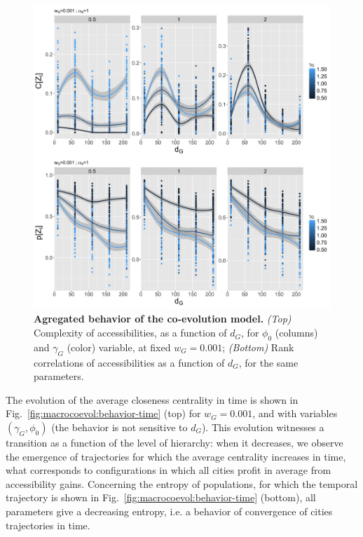 \begin{figure}
\includegraphics[width=\linewidth]{figures/6-2-2-fig-macrocoevol-behavior-aggreg.jpg}
\caption{\textbf{Agregated behavior of the co-evolution model.} \textit{(Top)} Complexity of accessibilities, as a function of $d_G$, for $\phi_0$ (columns) and $\gamma_G$ (color) variable, at fixed $w_G = 0.001$; \textit{(Bottom)} Rank correlations of accessibilities as a function of $d_G$, for the same parameters.\label{fig:macrocoevol:behavior-aggreg}}
\end{figure}


The evolution of the average closeness centrality in time is shown in Fig.~\ref{fig:macrocoevol:behavior-time} (top) for $w_G = 0.001$, and with variables $(\gamma_G,\phi_0)$ (the behavior is not sensitive to $d_G$). This evolution witnesses a transition as a function of the level of hierarchy: when it decreases, we observe the emergence of trajectories for which the average centrality increases in time, what corresponds to configurations in which all cities profit in average from accessibility gains. Concerning the entropy of populations, for which the temporal trajectory is shown in Fig.~\ref{fig:macrocoevol:behavior-time} (bottom), all parameters give a decreasing entropy, i.e. a behavior of convergence of cities trajectories in time.




